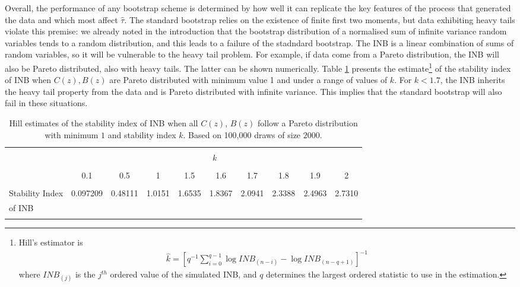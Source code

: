 \documentclass[english, 11pt,a4paper, ]{article}
\begin{document}
Overall, the performance of any bootstrap scheme is determined by how well it can replicate the key features of the process that generated the data and which  most affect $\hat{\tau}$. The standard bootstrap relies on the existence of finite first two moments, but data exhibiting heavy tails violate this premise: we already noted in the introduction that the bootstrap distribution of a normalised sum of infinite variance random variables tends to a random distribution, and this leads to a failure of the stadndard bootstrap. The INB is a linear combination of sums of random variables, so it will be vulnerable to the heavy tail problem. For example, if data come from a Pareto distribution, the INB will also be Pareto distributed, also with heavy tails. The latter can be shown numerically. Table \ref{table:Hill_estimate}  presents the \cite{hill1975aos} estimate\footnote{Hill's estimator is  
\begin{align}
	\hat{k}= \left[q^{-1}\sum_{i=0}^{q-1} \log INB_{(n-i)}-\log INB_{(n-q+1)} \right]^{-1}
\end{align}
where $INB_{(j)}$ is the $j^{th}$ ordered value of the simulated INB, and $q$ determines the largest ordered statistic to use in the estimation. } of the stability index of INB when $C(z), B(z)$ are Pareto distributed with minimum value 1 and under a range of values of $k$. For $k<1.7$, the INB inherits the heavy tail property from the data and is Pareto distributed with infinite variance. This implies that the standard bootstrap will also fail in these situations.
\begin{table}
	\centering
	\scriptsize
	\begin{tabular}{lccccccccc}
		\hline \hline \\
		&\multicolumn{9}{c}{$k$} \\
		\cline{2-10}\\
		& 0.1 &0.5& 1 &1.5& 1.6&1.7&1.8&1.9&2 \\ \cline{2-10}\\
		Stability Index  & 0.097209&0.48111&1.0151&1.6535&1.8367& 2.0941&2.3388&2.4963&2.7310 \\
		of INB&\\
		\hline \hline \\
	\end{tabular}
	\caption{Hill estimates of the stability index of INB when all $C(z)$, $B(z)$ follow a Pareto distribution with minimum $1$ and stability index $k$. Based on 100,000 draws of size $2000$.}
	\label{table:Hill_estimate}
\end{table}
\end{document}
